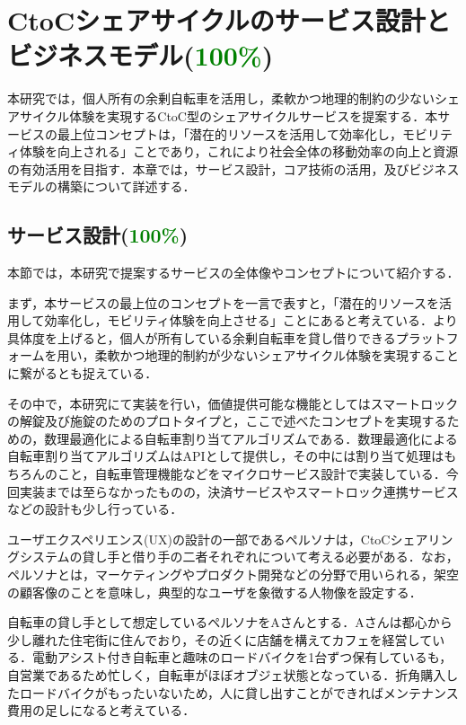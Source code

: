 \section{CtoCシェアサイクルのサービス設計とビジネスモデル(\textcolor{green}{100\%})}
  \label{sec:CtoCシェアサイクルのサービス設計とビジネスモデル}
    \par 本研究では，個人所有の余剰自転車を活用し，柔軟かつ地理的制約の少ないシェアサイクル体験を実現するCtoC型のシェアサイクルサービスを提案する．本サービスの最上位コンセプトは，「潜在的リソースを活用して効率化し，モビリティ体験を向上される」ことであり，これにより社会全体の移動効率の向上と資源の有効活用を目指す．本章では，サービス設計，コア技術の活用，及びビジネスモデルの構築について詳述する．
      
  \subsection{サービス設計(\textcolor{green}{100\%})}
    \label{sec:サービス設計}
      \par 本節では，本研究で提案するサービスの全体像やコンセプトについて紹介する．
      \par まず，本サービスの最上位のコンセプトを一言で表すと，「潜在的リソースを活用して効率化し，モビリティ体験を向上させる」ことにあると考えている．より具体度を上げると，個人が所有している余剰自転車を貸し借りできるプラットフォームを用い，柔軟かつ地理的制約が少ないシェアサイクル体験を実現することに繋がるとも捉えている．
      \par その中で，本研究にて実装を行い，価値提供可能な機能としてはスマートロックの解錠及び施錠のためのプロトタイプと，ここで述べたコンセプトを実現するための，数理最適化による自転車割り当てアルゴリズムである．数理最適化による自転車割り当てアルゴリズムはAPIとして提供し，その中には割り当て処理はもちろんのこと，自転車管理機能などをマイクロサービス設計で実装している．今回実装までは至らなかったものの，決済サービスやスマートロック連携サービスなどの設計も少し行っている．
      \par ユーザエクスペリエンス(UX)の設計の一部であるペルソナは，CtoCシェアリングシステムの貸し手と借り手の二者それぞれについて考える必要がある．なお，ペルソナとは，マーケティングやプロダクト開発などの分野で用いられる，架空の顧客像のことを意味し，典型的なユーザを象徴する人物像を設定する．
      \par 自転車の貸し手として想定しているペルソナをAさんとする．Aさんは都心から少し離れた住宅街に住んでおり，その近くに店舗を構えてカフェを経営している．電動アシスト付き自転車と趣味のロードバイクを1台ずつ保有しているも，自営業であるため忙しく，自転車がほぼオブジェ状態となっている．折角購入したロードバイクがもったいないため，人に貸し出すことができればメンテナンス費用の足しになると考えている．
